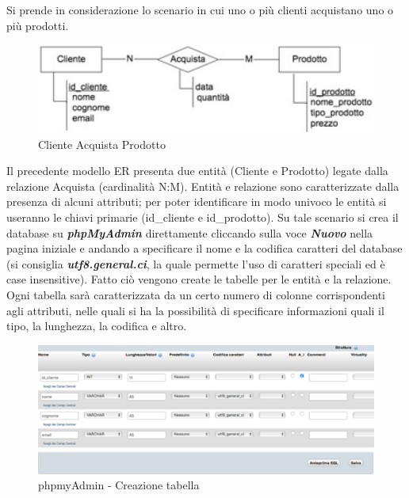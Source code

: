 Si prende in considerazione lo scenario in cui uno o più clienti acquistano uno o più prodotti.

\begin{center}
\begin{figure}[H]
\centering
\includegraphics[scale=1]{figures/cbuyp4.png}
\caption{Cliente Acquista Prodotto} 
\end{figure}
\end{center}

Il precedente modello ER presenta due entità (Cliente e Prodotto) legate dalla relazione Acquista (cardinalità N:M). Entità e relazione sono caratterizzate dalla presenza di alcuni attributi; per poter identificare in modo univoco le entità si useranno le chiavi primarie (id\_cliente e id\_prodotto). Su tale scenario si crea il database su \textit{\textbf{phpMyAdmin}} direttamente cliccando sulla voce \textit{\textbf{Nuovo}} nella pagina iniziale e andando a specificare il nome e la codifica caratteri del database (si consiglia \textit{\textbf{utf8.general.ci}}, la quale permette l'uso di caratteri speciali ed è case insensitive). Fatto ciò vengono create le tabelle per le entità e la relazione. Ogni tabella sarà caratterizzata da un certo numero di colonne corrispondenti agli attributi, nelle quali si ha la possibilità di specificare informazioni quali il tipo, la lunghezza, la codifica e altro. 

\begin{center}
\begin{figure}[H]
\centering
\includegraphics[scale=0.8]{figures/phpmyAdmin_table.png}
\caption{phpmyAdmin - Creazione tabella} 
\end{figure}
\end{center}

